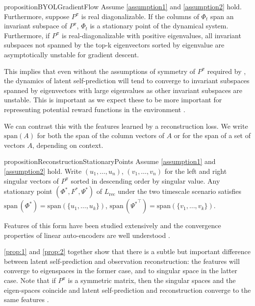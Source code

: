 \begin{restatable}{proposition}{BYOLGradientFlow}\label{prop:1}
Assume \autoref{assumption1} and \autoref{assumption2} hold.
Furthermore, suppose $P^\pi$ is real diagonalizable. 
If the columns of $\Phi_t$ span an invariant subspace of $P^\pi$, $\Phi_t$ is a stationary point of the dynamical system.
Furthermore, if $P^\pi$ is real-diagonalizable with positive eigenvalues, all invariant subspaces not spanned by the top-k eigenvectors sorted by eigenvalue are asymptotically unstable for gradient descent.
\end{restatable}

This implies that even without the assumptions of symmetry of $P^\pi$ required by \textcite{tang2022understanding}, the dynamics of latent self-prediction will tend to converge to invariant subspaces spanned by eigenvectors with large eigenvalues as other invariant subspaces are unstable.
This is important as we expect these to be more important for representing potential reward functions in the environment \parencite{lelan2023bootstrapped}. 

We can contrast this with the features learned by a reconstruction loss.
We write $\mathrm{span}(A)$ for both the span of the column vectors of $A$ or for the span of a set of vectors $A$, depending on context.
\begin{restatable}{proposition}{ReconstructionStationaryPoints}\label{prop:2}
Assume \autoref{assumption1} and \autoref{assumption2} hold. Write $(u_1,\dots,u_n)$, $(v_1,\dots,v_n)$ for the left and right singular vectors of $P^\pi$ sorted in descending order by singular value. Any stationary point $(\Phi^*, F^*, \Psi^*)$ of $L_\text{rec}$ under the two timescale scenario satisfies $\mathrm{span}\,(\Phi^*)=\mathrm{span}\left(\{u_1,\dots,u_k\}\right)$, $\mathrm{span}\,({\Psi^*}^\top)=\mathrm{span}\left(\{v_1,\dots,v_k\}\right)$.
\end{restatable}

Features of this form have been studied extensively and the convergence properties of linear auto-encoders are well understood \parencite{baldi1989neural,pretorius2018learning,bao2020regularized}.

\autoref{prop:1} and \autoref{prop:2} together show that there is a subtle but important difference between latent self-prediction and observation reconstruction: the features will converge to eigenspaces in the former case, and to singular space in the latter case.
Note that if $P^\pi$ is a symmetric matrix, then the singular spaces and the eigen-spaces coincide and latent self-prediction and reconstruction converge to the same features \parencite{tang2022understanding}.

